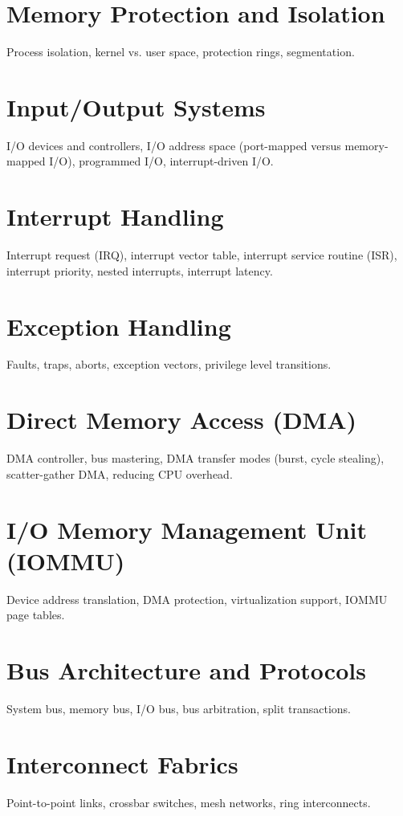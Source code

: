 \chapter{Memory Protection and Isolation}
Process isolation, kernel vs. user space, protection rings, segmentation.


\chapter{Input/Output Systems}
I/O devices and controllers, I/O address space (port-mapped versus memory-mapped I/O), programmed I/O, interrupt-driven I/O.

\chapter{Interrupt Handling}
Interrupt request (IRQ), interrupt vector table, interrupt service routine (ISR), interrupt priority, nested interrupts, interrupt latency.

\chapter{Exception Handling}
Faults, traps, aborts, exception vectors, privilege level transitions.

\chapter{Direct Memory Access (DMA)}
DMA controller, bus mastering, DMA transfer modes (burst, cycle stealing), scatter-gather DMA, reducing CPU overhead.

\chapter{I/O Memory Management Unit (IOMMU)}
Device address translation, DMA protection, virtualization support, IOMMU page tables.

\chapter{Bus Architecture and Protocols}
System bus, memory bus, I/O bus, bus arbitration, split transactions.

\chapter{Interconnect Fabrics}
Point-to-point links, crossbar switches, mesh networks, ring interconnects.

